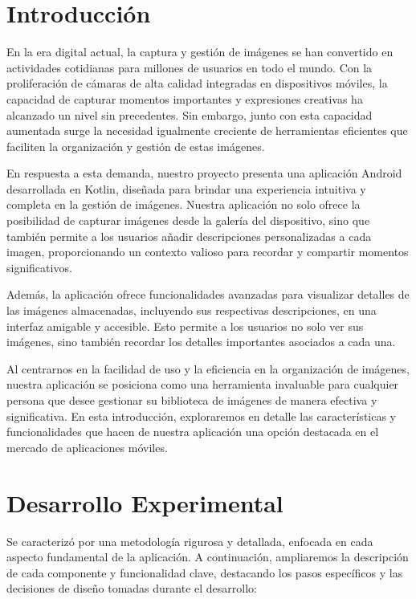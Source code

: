 \documentclass[conference]{IEEEtran}
\begin{document}
\section{Introducción}

En la era digital actual, la captura y gestión de imágenes se han convertido en actividades cotidianas para millones de usuarios en todo el mundo. Con la proliferación de cámaras de alta calidad integradas en dispositivos móviles, la capacidad de capturar momentos importantes y expresiones creativas ha alcanzado un nivel sin precedentes. Sin embargo, junto con esta capacidad aumentada surge la necesidad igualmente creciente de herramientas eficientes que faciliten la organización y gestión de estas imágenes.

En respuesta a esta demanda, nuestro proyecto presenta una aplicación Android desarrollada en Kotlin, diseñada para brindar una experiencia intuitiva y completa en la gestión de imágenes. Nuestra aplicación no solo ofrece la posibilidad de capturar imágenes desde la galería del dispositivo, sino que también permite a los usuarios añadir descripciones personalizadas a cada imagen, proporcionando un contexto valioso para recordar y compartir momentos significativos.

Además, la aplicación ofrece funcionalidades avanzadas para visualizar detalles de las imágenes almacenadas, incluyendo sus respectivas descripciones, en una interfaz amigable y accesible. Esto permite a los usuarios no solo ver sus imágenes, sino también recordar los detalles importantes asociados a cada una.

Al centrarnos en la facilidad de uso y la eficiencia en la organización de imágenes, nuestra aplicación se posiciona como una herramienta invaluable para cualquier persona que desee gestionar su biblioteca de imágenes de manera efectiva y significativa. En esta introducción, exploraremos en detalle las características y funcionalidades que hacen de nuestra aplicación una opción destacada en el mercado de aplicaciones móviles.
 
\section{Desarrollo Experimental}

Se caracterizó por una metodología rigurosa y detallada, enfocada en cada aspecto fundamental de la aplicación. A continuación, ampliaremos la descripción de cada componente y funcionalidad clave, destacando los pasos específicos y las decisiones de diseño tomadas durante el desarrollo:
\end{document}
